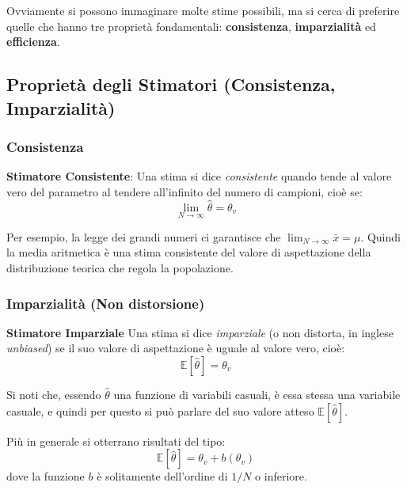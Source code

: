 \documentclass[openany,a4paper,12pt]{book}
\theoremstyle{remark}
\begin{document}
Ovviamente si possono immaginare molte stime possibili, ma si cerca di preferire quelle che hanno tre proprietà fondamentali: \textbf{consistenza}, \textbf{imparzialità} ed \textbf{efficienza}.

\subsection*{Proprietà degli Stimatori (Consistenza, Imparzialità)}
\subsubsection*{Consistenza}
\begin{definizione} \textbf{Stimatore Consistente}:
Una stima si dice \emph{consistente} quando tende al valore vero del parametro al tendere all'infinito del numero di campioni, cioè se:
\begin{equation*}
\lim_{N \to \infty} \hat{\theta} = \theta_v
\end{equation*}
\end{definizione}

Per esempio, la legge dei grandi numeri ci garantisce che $\lim_{N \to \infty} \bar{x} = \mu$. Quindi la media aritmetica è una stima consistente del valore di aspettazione della distribuzione teorica che regola la popolazione.

\subsubsection*{Imparzialità (Non distorsione)}
\begin{definizione} \textbf{Stimatore Imparziale}
Una stima si dice \emph{imparziale} (o non distorta, in inglese \emph{unbiased}) se il suo valore di aspettazione è uguale al valore vero, cioè:
\begin{equation*}
\mathbb{E}[\hat{\theta}] = \theta_v
\end{equation*}
\end{definizione}
Si noti che, essendo $\hat{\theta}$ una funzione di variabili casuali, è essa stessa una variabile casuale, e quindi per questo si può parlare del suo valore atteso $\mathbb{E}[\hat{\theta}]$.

Più in generale si otterrano risultati del tipo:
\begin{equation}
    \mathbb{E}[\hat{\theta}] = \theta_v + b(\theta_{v}) \label{eq: valore di aspettazione dello stimatore}
\end{equation} 
dove la funzione $b$ è solitamente dell'ordine di $1/N$ o inferiore.
\end{document}
